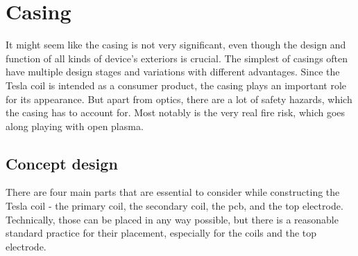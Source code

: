 \chapter{Casing}

It might seem like the casing is not very significant, even though the design and function of all kinds of device's exteriors is crucial. The simplest of casings often have multiple design stages and variations with different advantages. Since the Tesla coil is intended as a consumer product, the casing plays an important role for its appearance. But apart from optics, there are a lot of safety hazards, which the casing has to account for. Most notably is the very real fire risk, which goes along playing with open plasma.


\section{Concept design}
\label{sec:concept-design}

There are four main parts that are essential to consider while constructing the Tesla coil - the primary coil, the secondary coil, the \gls{pcb}, and the top electrode. Technically, those can be placed in any way possible, but there is a reasonable standard practice for their placement, especially for the coils and the top electrode. 

